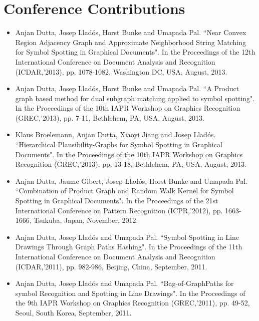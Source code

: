 \section*{Conference Contributions}

\begin{itemize}

\item Anjan Dutta, Josep Lladós, Horst Bunke and Umapada Pal. ``Near Convex Region Adjacency Graph and Approximate Neighborhood String Matching for Symbol Spotting in Graphical Documents". In the Proceedings of the 12th International Conference on Document Analysis and Recognition (ICDAR,'2013), pp. 1078-1082, Washington DC, USA, August, 2013.
\vspace*{.3cm}

\item Anjan Dutta, Josep Lladós, Horst Bunke and Umapada Pal. ``A Product graph based method for dual subgraph matching applied to symbol spotting". In the Proceedings of the 10th IAPR Workshop on Graphics Recognition (GREC,'2013), pp. 7-11, Bethlehem, PA, USA, August, 2013.
\vspace*{.3cm}

\item Klaus Broelemann, Anjan Dutta, Xiaoyi Jiang and Josep Lladós. ``Hierarchical Plausibility-Graphs for Symbol Spotting in Graphical Documents". In the Proceedings of the 10th IAPR Workshop on Graphics Recognition (GREC,'2013), pp. 13-18, Bethlehem, PA, USA, August, 2013.
\vspace*{.3cm}

\item Anjan Dutta, Jaume Gibert, Josep Lladós, Horst Bunke and Umapada Pal. ``Combination of Product Graph and Random Walk Kernel for Symbol Spotting in Graphical Documents". In the Proceedings of the 21st International Conference on Pattern Recognition (ICPR,'2012), pp. 1663-1666, Tsukuba, Japan, November, 2012.
\vspace*{.3cm}

\item Anjan Dutta, Josep Lladós and Umapada Pal. ``Symbol Spotting in Line Drawings Through Graph Paths Hashing". In the Proceedings of the 11th International Conference on Document Analysis and Recognition (ICDAR,'2011), pp. 982-986, Beijing, China, September, 2011.
\vspace*{.3cm}

\item Anjan Dutta, Josep Lladós and Umapada Pal. ``Bag-of-GraphPaths for symbol Recognition and Spotting in Line Drawings". In the Proceedings of the 9th IAPR Workshop on Graphics Recognition (GREC,'2011), pp. 49-52, Seoul, South Korea, September, 2011.
\vspace*{.3cm}


\end{itemize}
